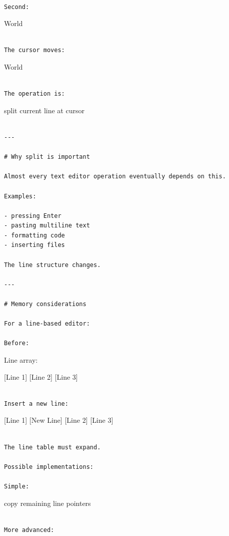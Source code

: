 \documentclass[
  oneside,
  openany]{book}
\begin{document}
\begin{verbatim}

Second:
\end{verbatim}

World

\begin{verbatim}

The cursor moves:
\end{verbatim}

World\textbar{}

\begin{verbatim}

The operation is:
\end{verbatim}

split current line at cursor

\begin{verbatim}

---

# Why split is important

Almost every text editor operation eventually depends on this.

Examples:

- pressing Enter
- pasting multiline text
- formatting code
- inserting files

The line structure changes.

---

# Memory considerations

For a line-based editor:

Before:
\end{verbatim}

Line array:

{[}Line 1{]} {[}Line 2{]} {[}Line 3{]}

\begin{verbatim}

Insert a new line:
\end{verbatim}

{[}Line 1{]} {[}New Line{]} {[}Line 2{]} {[}Line 3{]}

\begin{verbatim}

The line table must expand.

Possible implementations:

Simple:
\end{verbatim}

copy remaining line pointers

\begin{verbatim}

More advanced:
\end{verbatim}
\end{document}
